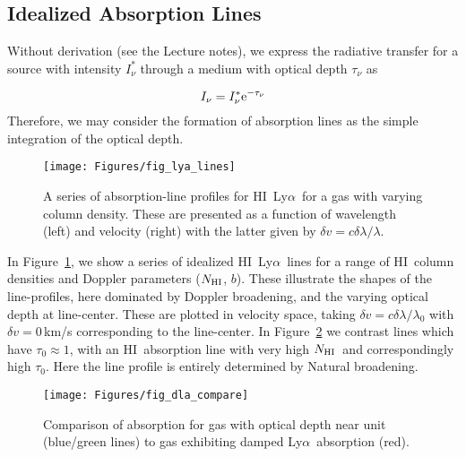 \documentclass[graybox]{svmult}
\newcommand{\HI}{H{\sc I}}
\def\lya{Ly$\alpha$}
\def\rme{{\rm e}}
\newcommand{\mnhi}{N_{\rm HI}}
\newcommand{\nhi}{$\mnhi$}
\begin{document}
\subsection{Idealized Absorption Lines}

Without derivation (see the Lecture notes),
we express the radiative transfer for a source with
intensity $I^*_\nu$ through a medium with
optical depth $\tau_\nu$ as

\begin{equation}
I_\nu = I_\nu^* \rme^{-\tau_\nu}
\end{equation}
Therefore, we may consider the formation of absorption lines as the 
simple integration of the optical depth.

%
\begin{figure}[b]
\texttt{[image: Figures/fig\_lya\_lines]}
%
%
\caption{A series of absorption-line profiles for \HI\ \lya\
for a gas with varying column density.
These are presented as a function of wavelength (left)
and velocity (right) with the latter given by
$\delta v = c \delta \lambda / \lambda$.
}
\label{fig:lyalines}       %
\end{figure}


In Figure~\ref{fig:lyalines}, we show a series of idealized \HI\ \lya\
lines for a range of \HI\ column densities and Doppler parameters
(\nhi, $b$).  These illustrate the shapes of the line-profiles, here
dominated by Doppler broadening, and the varying optical depth
at line-center.  These are plotted in velocity space, taking
$\delta v = c \delta \lambda / \lambda_0$ with 
$\delta v=0$\,km/s corresponding to the line-center.  
In Figure~\ref{fig:dla_compare}
we contrast lines which have $\tau_0 \approx 1$, with 
an \HI\ absorption line with very high \nhi\ and correspondingly
high $\tau_0$.  Here the line profile is entirely determined
by Natural broadening.

%
\begin{figure}[b]
\texttt{[image: Figures/fig\_dla\_compare]}
%
%
\caption{Comparison of absorption for gas with 
optical depth near unit (blue/green lines) to
gas exhibiting damped \lya\ absorption (red).
}
\label{fig:dla_compare}       %
\end{figure}
\end{document}
